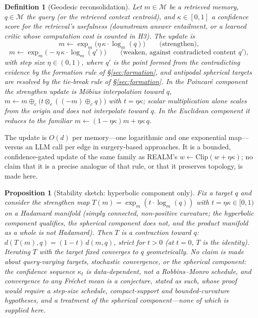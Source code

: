 \documentclass[11pt,a4paper]{article}
\newtheorem{proposition}{Proposition}
\newtheorem{definition}{Definition}
\newcommand{\M}{\mathcal{M}}
\begin{document}
\begin{definition}[Geodesic reconsolidation]
Let $m \in \M$ be a retrieved memory, $q \in \M$ the query (or the
retrieved context centroid), and $\kappa \in [0,1]$ a confidence score for the
retrieval's usefulness (downstream answer entailment, or a learned critic
whose computation cost is counted in H3). The update is
\begin{equation}
m \leftarrow \exp_m\!\big(\eta\,\kappa \cdot \log_m(q)\big)
\qquad\text{(strengthen)},
\end{equation}
\begin{equation}
m \leftarrow \exp_m\!\big(-\eta\,\kappa \cdot \log_m(q')\big)
\qquad\text{(weaken, against contradicted content $q'$)},
\end{equation}
with step size $\eta \in (0,1)$, where $q'$ is the point formed from the
contradicting evidence by the formation rule of
\S\ref{sec:formation}, and antipodal spherical targets are resolved by
the tie-break rule of \S\ref{sec:formation}. In the Poincar\'e component
the strengthen update is M\"obius interpolation toward $q$,
$m \leftarrow m \oplus_c \big(t \otimes_c ((-m) \oplus_c q)\big)$ with
$t = \eta\kappa$; scalar multiplication alone scales from the origin and
does not interpolate toward $q$. In the Euclidean
component it reduces to the familiar $m \leftarrow (1-\eta \kappa)m + \eta \kappa\,q$.
\end{definition}

The update is $O(d)$ per memory---one logarithmic and one exponential
map---versus an LLM call per edge in surgery-based approaches. It is a
bounded, confidence-gated update of the same family as REALM's $w \leftarrow
\mathrm{Clip}(w + \eta \kappa)$; no claim that it is a precise analogue of
that rule, or that it preserves topology, is made here.

\begin{proposition}[Stability sketch: hyperbolic component only]
Fix a target $q$ and consider the strengthen map
$T(m) = \exp_m(t \cdot \log_m(q))$ with $t = \eta \kappa \in [0,1)$ on a
Hadamard manifold (simply connected, non-positive curvature; the
hyperbolic component qualifies, the spherical component does not, and the
product manifold as a whole is not Hadamard). Then $T$ is a contraction toward
$q$: $d(T(m), q) = (1-t)\,d(m,q)$, strict for $t > 0$ (at $t = 0$, $T$ is
the identity). Iterating $T$ with the target fixed
converges to $q$ geometrically. No claim is made about query-varying
targets, stochastic convergence, or the spherical component: the
confidence sequence $\kappa_t$ is data-dependent, not a Robbins--Monro
schedule, and convergence to any Fr\'echet mean is a conjecture, stated
as such, whose proof would require a step-size schedule, compact-support
and bounded-curvature hypotheses, and a treatment of the spherical
component---none of which is supplied here.
\end{proposition}
\end{document}
